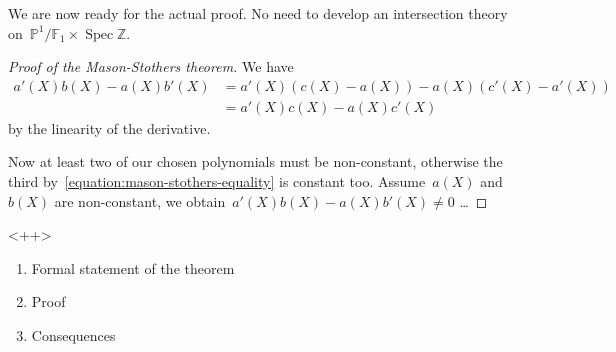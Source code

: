 \documentclass[11pt, a4paper, openany, oneside, article]{memoir}
\theoremstyle{definition}
\begin{document}
We are now ready for the actual proof. No need to develop an intersection theory on~$\mathbb{P}^1/\mathbb{F}_1\times\operatorname{Spec}\mathbb{Z}$.

\begin{proof}[Proof of the Mason-Stothers theorem]
  We have
  \begin{equation}
    \begin{aligned}
      a'(X)b(X)-a(X)b'(X)&=a'(X)\left( c(X)-a(X) \right)-a(X)\left( c'(X)-a'(X) \right) \\
      &=a'(X)c(X)-a(X)c'(X)
    \end{aligned}
  \end{equation}
  by the linearity of the derivative.

  Now at least two of our chosen polynomials must be non-constant, otherwise the third by~\eqref{equation:mason-stothers-equality} is constant too. Assume~$a(X)$ and~$b(X)$ are non-constant, we obtain~$a'(X)b(X)-a(X)b'(X)\neq 0$ \dots{}
\end{proof}<++>

\begin{enumerate}
  \item Formal statement of the theorem
  \item Proof
  \item Consequences
\end{enumerate}




\end{document}
